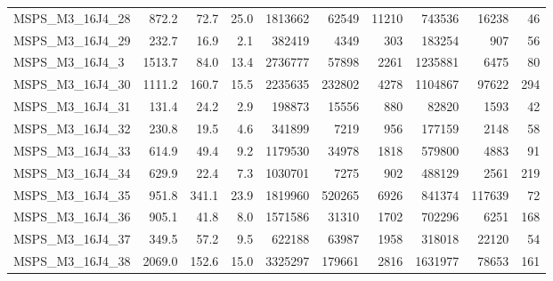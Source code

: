 \documentclass[a4paper,10pt]{article}
\theoremstyle{definition}
\begin{document}
\begin{table}[t]
\begin{scriptsize}
\begin{tabular*}{\textwidth}{@{}l@{\;\;\extracolsep{\fill}}rrrrrrrrr@{}}
MSPS\_M3\_16J4\_28 & \num{ 872.2} & \num{  72.7} & \num{  25.0} & \num{   1813662} & \num{     62549} & \num{     11210} & \num{    743536} & \num{     16238} & \num{        46}\\
MSPS\_M3\_16J4\_29 & \num{ 232.7} & \num{  16.9} & \num{   2.1} & \num{    382419} & \num{      4349} & \num{       303} & \num{    183254} & \num{       907} & \num{        56}\\
 MSPS\_M3\_16J4\_3 & \num{1513.7} & \num{  84.0} & \num{  13.4} & \num{   2736777} & \num{     57898} & \num{      2261} & \num{   1235881} & \num{      6475} & \num{        80}\\
MSPS\_M3\_16J4\_30 & \num{1111.2} & \num{ 160.7} & \num{  15.5} & \num{   2235635} & \num{    232802} & \num{      4278} & \num{   1104867} & \num{     97622} & \num{       294}\\
MSPS\_M3\_16J4\_31 & \num{ 131.4} & \num{  24.2} & \num{   2.9} & \num{    198873} & \num{     15556} & \num{       880} & \num{     82820} & \num{      1593} & \num{        42}\\
MSPS\_M3\_16J4\_32 & \num{ 230.8} & \num{  19.5} & \num{   4.6} & \num{    341899} & \num{      7219} & \num{       956} & \num{    177159} & \num{      2148} & \num{        58}\\
MSPS\_M3\_16J4\_33 & \num{ 614.9} & \num{  49.4} & \num{   9.2} & \num{   1179530} & \num{     34978} & \num{      1818} & \num{    579800} & \num{      4883} & \num{        91}\\
MSPS\_M3\_16J4\_34 & \num{ 629.9} & \num{  22.4} & \num{   7.3} & \num{   1030701} & \num{      7275} & \num{       902} & \num{    488129} & \num{      2561} & \num{       219}\\
MSPS\_M3\_16J4\_35 & \num{ 951.8} & \num{ 341.1} & \num{  23.9} & \num{   1819960} & \num{    520265} & \num{      6926} & \num{    841374} & \num{    117639} & \num{        72}\\
MSPS\_M3\_16J4\_36 & \num{ 905.1} & \num{  41.8} & \num{   8.0} & \num{   1571586} & \num{     31310} & \num{      1702} & \num{    702296} & \num{      6251} & \num{       168}\\
MSPS\_M3\_16J4\_37 & \num{ 349.5} & \num{  57.2} & \num{   9.5} & \num{    622188} & \num{     63987} & \num{      1958} & \num{    318018} & \num{     22120} & \num{        54}\\
MSPS\_M3\_16J4\_38 & \num{2069.0} & \num{ 152.6} & \num{  15.0} & \num{   3325297} & \num{    179661} & \num{      2816} & \num{   1631977} & \num{     78653} & \num{       161}\\

\end{tabular*}
\end{scriptsize}
\end{table}
\end{document}
